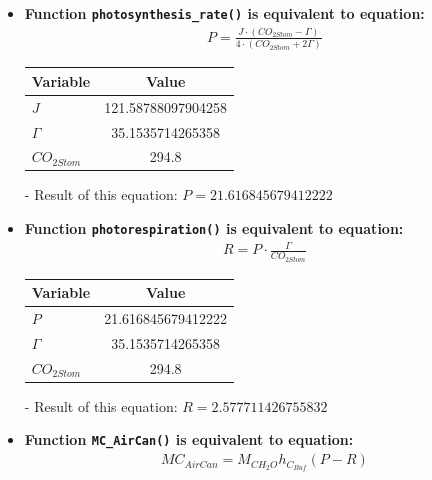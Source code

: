 \documentclass[a4paper]{article}
\numberwithin{equation}{section}
\begin{document}
\begin{itemize}
  \item \textbf{Function \texttt{photosynthesis\_rate()} is equivalent to equation:}
        \begin{align*}
          P = \frac{J \cdot (CO_{2Stom} - \Gamma)}{4 \cdot (CO_{2Stom} + 2\Gamma)}
        \end{align*}

        \begin{table}[H]
          \centering
          \begin{tabular}{@{}lS[table-format=3.15]@{}}
            \toprule
            \textbf{Variable} & \textbf{Value}     \\
            \midrule
            \(J\)             & 121.58788097904258 \\
            \(\Gamma\)        & 35.1535714265358   \\
            \(CO_{2Stom}\)    & 294.8              \\
            \bottomrule
          \end{tabular}
        \end{table}

  \item[-] Result of this equation: \(P = 21.616845679412222\)

  \item \textbf{Function \texttt{photorespiration()} is equivalent to equation:}
        \begin{align*}
          R = P \cdot \frac{\Gamma}{CO_{2Stom}}
        \end{align*}

        \begin{table}[H]
          \centering
          \begin{tabular}{@{}lS[table-format=3.15]@{}}
            \toprule
            \textbf{Variable} & \textbf{Value}     \\
            \midrule
            \(P\)             & 21.616845679412222 \\
            \(\Gamma\)        & 35.1535714265358   \\
            \(CO_{2Stom}\)    & 294.8              \\
            \bottomrule
          \end{tabular}
        \end{table}

  \item[-] Result of this equation: \(R = 2.577711426755832\)

  \item \textbf{Function \texttt{MC\_AirCan()} is equivalent to equation:}
        \begin{align*}
          MC_{AirCan} = M_{CH_2O} h_{C_{Buf}} (P - R)
        \end{align*}


\end{itemize}
\end{document}
